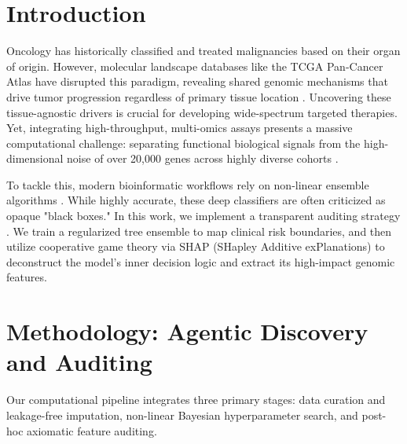 \documentclass[11pt]{article}
\begin{document}
\section{Introduction}

Oncology has historically classified and treated malignancies based on their organ of origin. However, molecular landscape databases like the TCGA Pan-Cancer Atlas \citep{weinstein2013cancer, tomczak2015} have disrupted this paradigm, revealing shared genomic mechanisms that drive tumor progression regardless of primary tissue location \citep{colaprico2016, cerami2012}. Uncovering these tissue-agnostic drivers is crucial for developing wide-spectrum targeted therapies. Yet, integrating high-throughput, multi-omics assays presents a massive computational challenge: separating functional biological signals from the high-dimensional noise of over 20,000 genes across highly diverse cohorts \citep{subramanian2020, wang2021evaluation, vahabi2022unsupervised, krassowski2020}.

To tackle this, modern bioinformatic workflows rely on non-linear ensemble algorithms \citep{pedregosa2011, kang2022roadmap}. While highly accurate, these deep classifiers are often criticized as opaque "black boxes." In this work, we implement a transparent auditing strategy \citep{Leiser2023XAIOmics, li2024explainable}. We train a regularized tree ensemble to map clinical risk boundaries, and then utilize cooperative game theory via SHAP (SHapley Additive exPlanations) \citep{lundberg2017unified, lundberg2018explainable} to deconstruct the model's inner decision logic and extract its high-impact genomic features.

\section{Methodology: Agentic Discovery and Auditing}

Our computational pipeline integrates three primary stages: data curation and leakage-free imputation, non-linear Bayesian hyperparameter search, and post-hoc axiomatic feature auditing.
\end{document}
